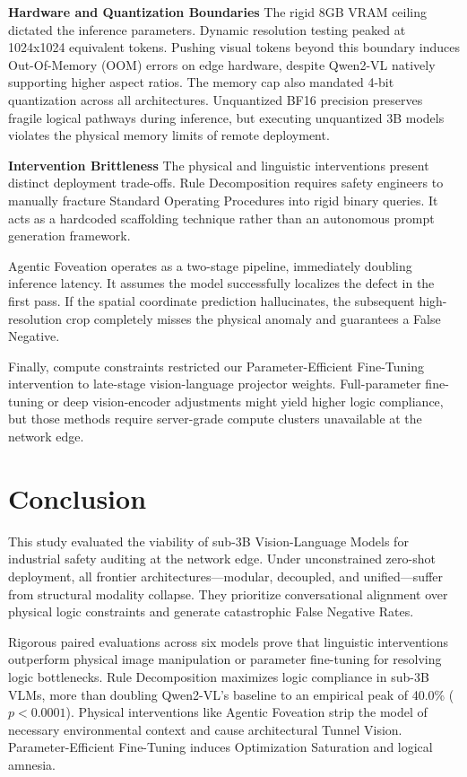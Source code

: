 \documentclass{article}
\begin{document}
\textbf{Hardware and Quantization Boundaries}
The rigid 8GB VRAM ceiling dictated the inference parameters. Dynamic resolution testing peaked at 1024x1024 equivalent tokens. Pushing visual tokens beyond this boundary induces Out-Of-Memory (OOM) errors on edge hardware, despite Qwen2-VL natively supporting higher aspect ratios. The memory cap also mandated 4-bit quantization across all architectures. Unquantized BF16 precision preserves fragile logical pathways during inference, but executing unquantized 3B models violates the physical memory limits of remote deployment.

\textbf{Intervention Brittleness}
The physical and linguistic interventions present distinct deployment trade-offs. Rule Decomposition requires safety engineers to manually fracture Standard Operating Procedures into rigid binary queries. It acts as a hardcoded scaffolding technique rather than an autonomous prompt generation framework.

Agentic Foveation operates as a two-stage pipeline, immediately doubling inference latency. It assumes the model successfully localizes the defect in the first pass. If the spatial coordinate prediction hallucinates, the subsequent high-resolution crop completely misses the physical anomaly and guarantees a False Negative.

Finally, compute constraints restricted our Parameter-Efficient Fine-Tuning intervention to late-stage vision-language projector weights. Full-parameter fine-tuning or deep vision-encoder adjustments might yield higher logic compliance, but those methods require server-grade compute clusters unavailable at the network edge.

\section*{Conclusion}


This study evaluated the viability of sub-3B Vision-Language Models for industrial safety auditing at the network edge. Under unconstrained zero-shot deployment, all frontier architectures—modular, decoupled, and unified—suffer from structural modality collapse. They prioritize conversational alignment over physical logic constraints and generate catastrophic False Negative Rates. 

Rigorous paired evaluations across six models prove that linguistic interventions outperform physical image manipulation or parameter fine-tuning for resolving logic bottlenecks. Rule Decomposition maximizes logic compliance in sub-3B VLMs, more than doubling Qwen2-VL's baseline to an empirical peak of 40.0\% ($p < 0.0001$). Physical interventions like Agentic Foveation strip the model of necessary environmental context and cause architectural Tunnel Vision. Parameter-Efficient Fine-Tuning induces Optimization Saturation and logical amnesia.
\end{document}
